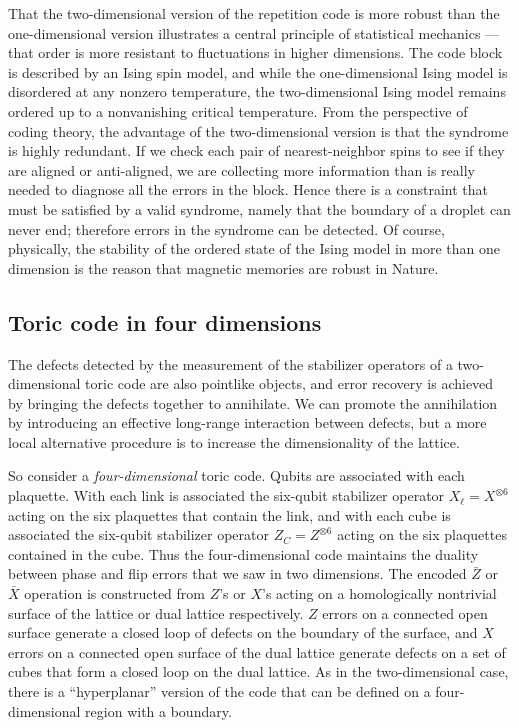 That the two-dimensional version of the repetition code is more robust than the one-dimensional version illustrates a central principle of statistical mechanics --- that order is more resistant to fluctuations in higher dimensions. The code block is described by an Ising spin model, and while the one-dimensional Ising model is disordered at any nonzero temperature, the two-dimensional Ising model remains ordered up to a nonvanishing critical temperature. From the perspective of coding theory, the advantage of the two-dimensional version is that the syndrome is highly redundant. If we check each pair of nearest-neighbor spins to see if they are aligned or anti-aligned, we are collecting more information than is really needed to diagnose all the errors in the block. Hence there is a constraint that must be satisfied by a valid syndrome, namely that the boundary of a droplet can never end; therefore errors in the syndrome can be detected. Of course, physically, the stability of the ordered state of the Ising model in more than one dimension is the reason that magnetic memories are robust in Nature.

\subsection{Toric code in four dimensions}
The defects detected by the measurement of the stabilizer operators of a two-dimensional toric
code are also pointlike objects, and error recovery is achieved by bringing the
defects together to annihilate. We can promote the annihilation by introducing
an effective long-range interaction between defects, but a more local alternative procedure
is to increase the dimensionality of the lattice.

So consider a {\em four-dimensional} toric code.  Qubits are associated with each
plaquette.  With each link is associated the six-qubit stabilizer operator
$X_\ell=X^{\otimes 6}$ acting on the six plaquettes that contain the link, and with each cube
is associated the six-qubit stabilizer operator $Z_C=Z^{\otimes 6}$ acting on the six
plaquettes contained in the cube.  Thus the four-dimensional code maintains the
duality between phase and flip errors that we saw in two dimensions.  The
encoded $\bar Z$ or $\bar X$ operation is constructed from $Z$'s or $X$'s
acting on a homologically nontrivial surface of the lattice or dual lattice
respectively.   $Z$ errors on a connected open surface generate a closed loop
of defects on the boundary of the surface, and $X$ errors on a connected open
surface of the dual lattice generate defects on a set of cubes that form a
closed loop on the dual lattice. As in the two-dimensional case, there is a ``hyperplanar'' version of the code that can be defined on a four-dimensional region with a boundary.

